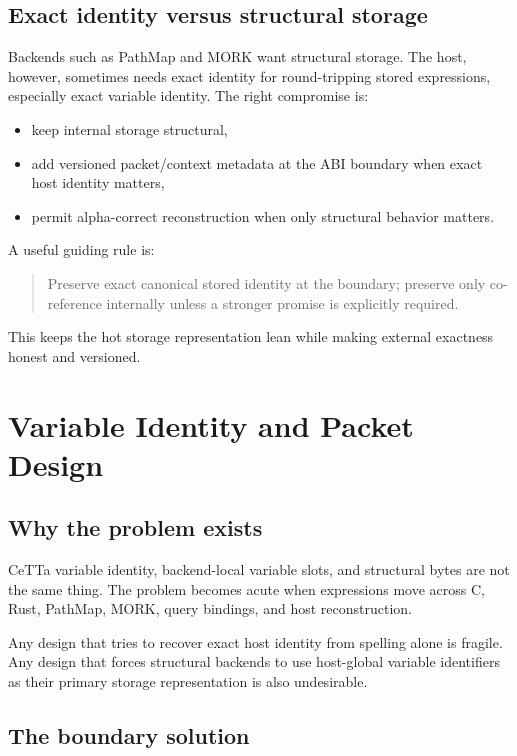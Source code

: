 \documentclass[11pt]{article}
\begin{document}
\subsection{Exact identity versus structural storage}

Backends such as PathMap and MORK want structural storage. The host, however, sometimes needs exact identity for round-tripping stored expressions, especially exact variable identity. The right compromise is:

\begin{itemize}
  \item keep internal storage structural,
  \item add versioned packet/context metadata at the ABI boundary when exact host identity matters,
  \item permit alpha-correct reconstruction when only structural behavior matters.
\end{itemize}

A useful guiding rule is:

\begin{quote}
Preserve exact canonical stored identity at the boundary; preserve only co-reference internally unless a stronger promise is explicitly required.
\end{quote}

This keeps the hot storage representation lean while making external exactness honest and versioned.

\section{Variable Identity and Packet Design}

\subsection{Why the problem exists}

CeTTa variable identity, backend-local variable slots, and structural bytes are not the same thing. The problem becomes acute when expressions move across C, Rust, PathMap, MORK, query bindings, and host reconstruction.

Any design that tries to recover exact host identity from spelling alone is fragile. Any design that forces structural backends to use host-global variable identifiers as their primary storage representation is also undesirable.

\subsection{The boundary solution}
\end{document}
